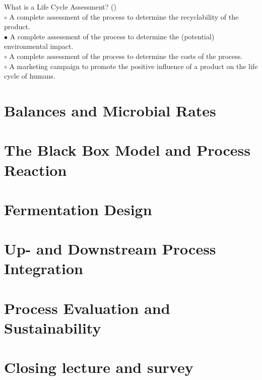 \documentclass[]{beamer}
\begin{document}
\begin{CJK}{UTF8}{gbsn}
\begin{frame}[shrink] {}
\end{frame}
\begin{frame}[shrink] {}
\addtocounter{answers}{1}
\color{blue}
What is a Life Cycle Assessment?
({})\\
\color{black}
\setlength{\parindent}{-0.4cm}
{\color{red}$\circ$} A complete assessment of the process to determine the recyclability of the product.  \\
{\color{red}$\bullet$} A complete assessment of the process to determine the (potential) environmental impact.  \\
{\color{red}$\circ$} A complete assessment of the process to determine the costs of the process.  \\
{\color{red}$\circ$} A marketing campaign to promote the positive influence of a product on the life cycle of humans.  \\

\end{frame}
\section{Balances and Microbial Rates}
\section{The Black Box Model and Process Reaction}
\section{Fermentation Design}
\section{Up- and Downstream Process Integration}
\section{Process Evaluation and Sustainability}
\section{Closing lecture and survey}

\end{CJK}
\end{document}
